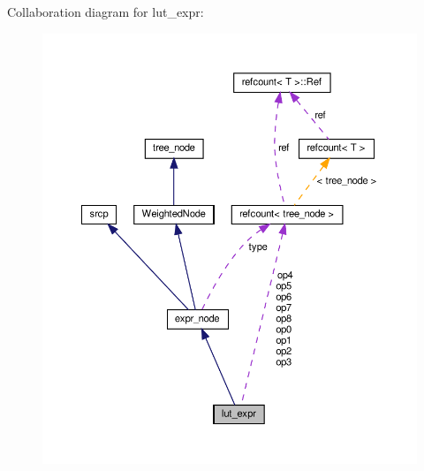 Collaboration diagram for lut\+\_\+expr\+:
\nopagebreak
\begin{figure}[H]
\begin{center}
\leavevmode
\includegraphics[width=350pt]{dc/d16/structlut__expr__coll__graph}
\end{center}
\end{figure}
